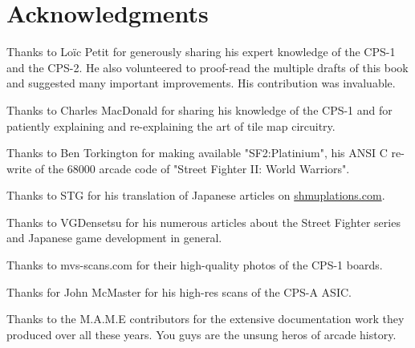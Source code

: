 \chapter*{Acknowledgments} 

Thanks to Lo\"{i}c Petit for generously sharing his expert knowledge of the CPS-1 and the CPS-2. He also volunteered to proof-read the multiple drafts of this book and suggested many important improvements. His contribution was invaluable.

Thanks to Charles MacDonald for sharing his knowledge of the CPS-1 and for patiently explaining and re-explaining the art of tile map circuitry.

Thanks to Ben Torkington for making available "SF2:Platinium", his ANSI C re-write of the 68000 arcade code of "Street Fighter II: World Warriors".

Thanks to STG for his translation of Japanese articles on \href{https://shmuplations.com}{shmuplations.com}.

Thanks to VGDensetsu for his numerous articles about the Street Fighter series and Japanese game development in general.

Thanks to mvs-scans.com for their high-quality photos of the CPS-1 boards.

Thanks for John McMaster for his high-res scans of the CPS-A ASIC.

Thanks to the M.A.M.E contributors for the extensive documentation work they produced over all these years. You guys are the unsung heros of arcade history.